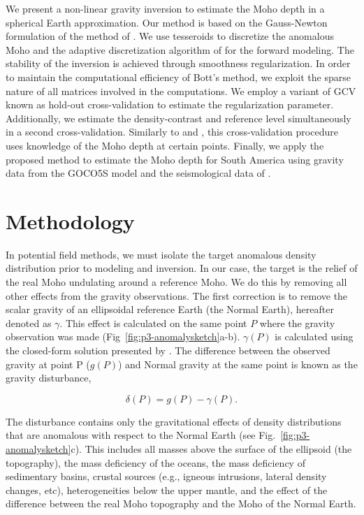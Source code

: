 We present a non-linear gravity inversion to estimate the Moho depth in
a spherical Earth approximation.
Our method is based on the \citet{silva2014} Gauss-Newton formulation of the
method of \citet{bott1960}.
We use tesseroids to discretize the anomalous Moho and the adaptive
discretization algorithm of \citet{uieda2016} for the forward modeling.
The stability of the inversion is achieved through smoothness regularization.
In order to maintain the computational efficiency of Bott's method,
we exploit the sparse nature of all matrices involved in the computations.
We employ a variant of GCV known as hold-out cross-validation \citep{kim2009}
to estimate the regularization parameter.
Additionally, we estimate the density-contrast and reference level
simultaneously in a second cross-validation.
Similarly to \citet{silva2006} and \citet{martins2010}, this cross-validation
procedure uses knowledge of the Moho depth at certain points.
Finally, we apply the proposed method to estimate the Moho depth for South
America using gravity data from the GOCO5S model \citep{mayer-guerr2015} and
the seismological data of \citet{assumpcao2013a}.



\section{Methodology}

In potential field methods,
we must isolate the target anomalous density distribution prior to modeling and
inversion.
In our case, the target is the relief of the real Moho undulating around a
reference Moho.
We do this by removing all other effects from the gravity observations.
The first correction is to remove the
scalar gravity of an ellipsoidal reference Earth (the Normal Earth),
hereafter denoted as $\gamma$.
This effect is calculated on the same point $P$ where
the gravity observation was made
(Fig~\ref{fig:p3-anomalysketch}a-b).
$\gamma(P)$ is calculated using
the closed-form solution presented by \citet{li2001a}.
The difference between the observed gravity at point P ($g(P)$)
and Normal gravity at the same point
is known as the gravity disturbance,

\begin{equation}
    \delta(P) = g(P) - \gamma(P).
    \label{eq:p3-disturbance}
\end{equation}

The disturbance contains only the gravitational effects of density
distributions that are anomalous with respect to the Normal Earth
(see Fig.~\ref{fig:p3-anomalysketch}c).
This includes all masses above the surface of the ellipsoid (the topography),
the mass deficiency of the oceans,
the mass deficiency of sedimentary basins,
crustal sources (e.g., igneous intrusions, lateral density changes, etc),
heterogeneities below the upper mantle,
and the effect of the difference between the real Moho
topography and the Moho of the Normal Earth.

